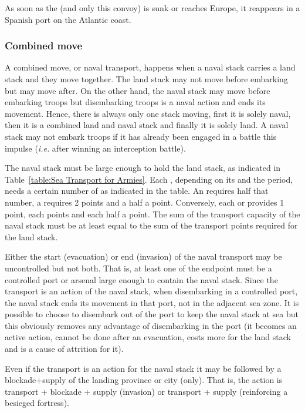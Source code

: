  \label{chMilitary:FlotaDeOroMovement} As soon as the
 (and only this convoy) is sunk or reaches Europe, it
reappears in a Spanish port on the Atlantic coast.

\subsubsection{Combined move}
A combined move, or naval transport, happens when a naval stack carries a land
stack and they move together. The land stack may not move before embarking but
may move after. On the other hand, the naval stack may move before embarking
troops but disembarking troops is a naval action and ends its movement. Hence,
there is always only one stack moving, first it is solely naval, then it is a
combined land and naval stack and finally it is solely land. A naval stack may
not embark troops if it has already been engaged in a battle this impulse
(\emph{i.e.} after winning an interception battle).

The naval stack must be large enough to hold the land stack, as indicated in
Table~\ref{table:Sea Transport for Armies}. Each \ARMY\Faceplus, depending on
its  and the period, needs a certain number of
 as indicated in the table. An \ARMY\Facemoins
requires half that number, a \LD requires 2 points and a \LDE half a
point. Conversely, each \NWD or \NGD provides 1 point, each  points and
each \NDE half a point. The sum of the transport capacity of the naval stack
must be at least equal to the sum of the transport points required for the
land stack.


Either the start (evacuation) or end (invasion) of the naval transport may be
uncontrolled but not both. That is, at least one of the endpoint must be a
controlled port or arsenal large enough to contain the naval stack. Since the
transport is an action of the naval stack, when disembarking in a controlled
port, the naval stack ends its movement in that port, not in the adjacent sea
zone. It is possible to choose to disembark out of the port to keep the naval
stack at sea but this obviously removes any advantage of disembarking in the
port (it becomes an active action, cannot be done after an evacuation, costs
more \MP for the land stack and is a cause of attrition for it).

Even if the transport is an action for the naval stack it may be followed by a
blockade+supply of the landing province or city (only). That is, the action is
transport + blockade + supply (invasion) or transport + supply (reinforcing a
besieged fortress).

